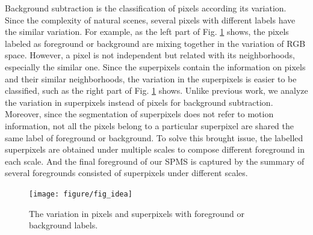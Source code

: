 \documentclass[runningheads,a4paper]{llncs}
\newcommand{\reffig}[1]{Fig. \ref{#1}}
\begin{document}
Background subtraction is the classification of pixels according its variation.
Since the complexity of natural scenes, several pixels with different labels have the
similar variation.
For example, as the left part of \reffig{thinking} shows, the pixels labeled as
foreground or background are mixing together in the variation of RGB space.
% 
However, a pixel is not independent \cite{2009_ICASSP_ViBe} but related
with its neighborhoods, especially the similar one.
% 
Since the superpixels contain the information on pixels and their similar neighborhoods, the variation in
the superpixels is easier to be classified, such as the right part
of \reffig{thinking} shows.
% 
Unlike previous work, we analyze the variation in superpixels instead of pixels for
background subtraction.
Moreover, since the segmentation of superpixels does not refer to motion
information, not all the pixels belong to a particular superpixel are shared
the same label of foreground or background.
To solve this brought issue, the labelled superpixels are obtained under
multiple scales to compose different foreground in each scale.
And the final foreground of our SPMS is captured by the summary of several foregrounds
consisted of superpixels under different scales.
\begin{figure}
    \centering
    \texttt{[image: figure/fig\_idea]}
    \caption{The variation in pixels and superpixels with foreground or background labels.}
    \label{thinking}
\end{figure}
\end{document}
